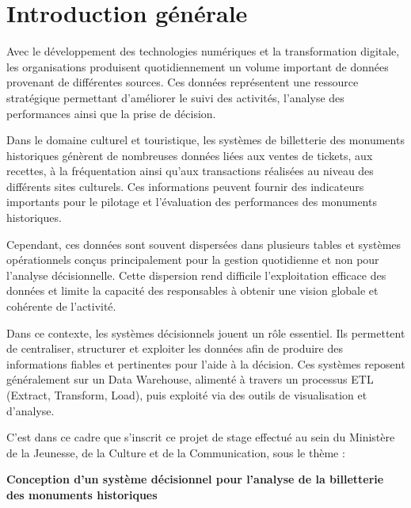 \documentclass[12pt,a4paper]{report}
\begin{document}
	\listoffigures
	\newpage
	
	
\chapter*{Introduction générale}

Avec le développement des technologies numériques et la transformation digitale, les organisations produisent quotidiennement un volume important de données provenant de différentes sources. Ces données représentent une ressource stratégique permettant d’améliorer le suivi des activités, l’analyse des performances ainsi que la prise de décision.

Dans le domaine culturel et touristique, les systèmes de billetterie des monuments historiques génèrent de nombreuses données liées aux ventes de tickets, aux recettes, à la fréquentation ainsi qu’aux transactions réalisées au niveau des différents sites culturels. Ces informations peuvent fournir des indicateurs importants pour le pilotage et l’évaluation des performances des monuments historiques.

Cependant, ces données sont souvent dispersées dans plusieurs tables et systèmes opérationnels conçus principalement pour la gestion quotidienne et non pour l’analyse décisionnelle. Cette dispersion rend difficile l’exploitation efficace des données et limite la capacité des responsables à obtenir une vision globale et cohérente de l’activité.

Dans ce contexte, les systèmes décisionnels jouent un rôle essentiel. Ils permettent de centraliser, structurer et exploiter les données afin de produire des informations fiables et pertinentes pour l’aide à la décision. Ces systèmes reposent généralement sur un Data Warehouse, alimenté à travers un processus ETL (Extract, Transform, Load), puis exploité via des outils de visualisation et d’analyse.

C’est dans ce cadre que s’inscrit ce projet de stage effectué au sein du Ministère de la Jeunesse, de la Culture et de la Communication, sous le thème :

\begin{center}
	\textbf{\Large Conception d’un système décisionnel pour l’analyse de la billetterie des monuments historiques}
\end{center}
\end{document}

